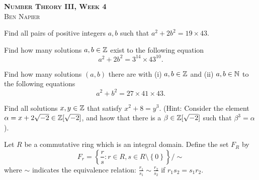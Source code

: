 \documentclass[a4paper, answers]{exam}
\begin{document}
\begin{center}
	\textbf{\textsc{Number Theory III, Week 4}} \\
	\textsc{Ben Napier}
	\vspace{1em}
\end{center}

\begin{questions}
	\question 
	Find all pairs of positive integers $a,b$ such that
	$a^2 + 2b^2 = 19 \times 43$.

	\question
	Find how many solutions $a,b \in \mathbb{Z}$ exist to the following equation
	\[
		a^2 + 2b^2 = 3^{14} \times 43^{10}.
	\]

	\question
	Find how many solutions $(a,b)$ there are with 
	(i) $a,b \in \mathbb{Z}$ and
	(ii) $a,b \in \mathbb{N}$
	to the following equations
	\[
		a^2 + b^2 = 27 \times 41 \times 43.
	\]

	\question
	Find all solutions $x, y \in \mathbb{Z}$ that satisfy $x^2 + 8 = y^3$.
	(Hint: Consider the element $\alpha = x + 2\sqrt{-2} \in \mathbb{Z}[\sqrt{-2}]$,
	and hsow that there is a $\beta \in \mathbb{Z}[\sqrt{-2}]$ such that
	$\beta^3 = \alpha$).

	\question
	Let $R$ be a commutative ring which is an integral domain.
	Define the set $F_R$ by
	\[
		F_r = \left\{
			\frac rs :
			r \in R,
			s \in R \setminus \left\{
				0
			\right\}
		\right\} / {\sim}
	\]
	where ${\sim}$ indicates the equivalence relation:
	$\frac{r_1}{s_1} \sim \frac{r_2}{s_2}$
	if $r_1s_2 = s_1r_2$.
\end{questions}
\end{document}

